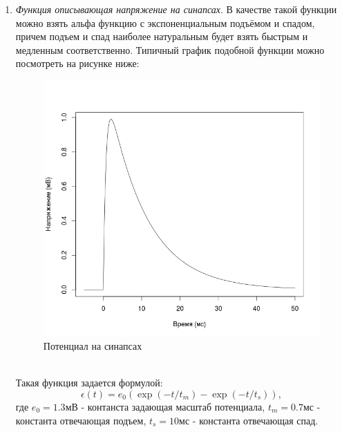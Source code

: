 \documentclass[a4paper,10pt]{article}
\begin{document}
\begin{enumerate}
\item \textit{Функция описывающая напряжение на синапсах}. В качестве такой функции можно взять альфа функцию с экспоненциальным подъёмом и спадом, причем подъем и спад наиболее натуральным будет взять быстрым и медленным соответственно. Типичный график подобной функции можно посмотреть на рисунке ниже:
\begin{figure}[ht]
\centering
\includegraphics[width=0.75\linewidth]{epsp}
\caption{Потенциал на синапсах}
\end{figure} \\
Такая функция задается формулой:
\begin{equation}\label{eq:epsp}
\epsilon(t) =	e_{0}(\exp(-t/t_{m})-\exp(-t/t_{s})),
\end{equation}
где $e_{0} = 1.3$мВ - контанста задающая масштаб потенциала, $t_{m}=0.7$мс - константа отвечающая подъем, $t_{s} = 10$мс - константа отвечающая спад.


\end{enumerate}
\end{document}
